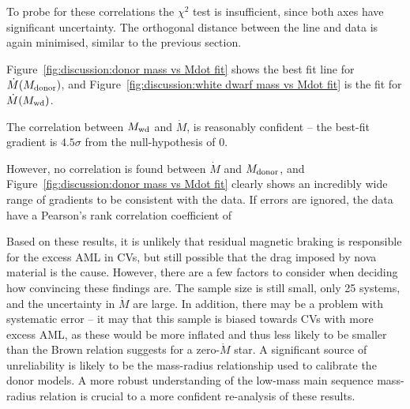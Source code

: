 To probe for these correlations the $\chi^2$ test is insufficient, since both axes have significant uncertainty. The orthogonal distance between the line and data is again minimised, similar to the previous section.

Figure~\ref{fig:discussion:donor mass vs Mdot fit} shows the best fit line for $\dot M(M_{\rm donor})$, and Figure~\ref{fig:discussion:white dwarf mass vs Mdot fit} is the fit for $\dot M(M_{\rm wd})$.

The correlation between $M_{\rm wd}$ and $\dot M$, is reasonably confident -- the best-fit gradient is $4.5\sigma$ from the null-hypothesis of 0.

However, no correlation is found between $\dot M$ and $M_{\rm donor}$, and Figure~\ref{fig:discussion:donor mass vs Mdot fit} clearly shows an incredibly wide range of gradients to be consistent with the data. If errors are ignored, the data have a Pearson's rank correlation coefficient of

Based on these results, it is unlikely that residual magnetic braking is responsible for the excess AML in CVs, but still possible that the drag imposed by nova material is the cause.
However, there are a few factors to consider when deciding how convincing these findings are.
The sample size is still small, only 25 systems, and the uncertainty in $\dot M$ are large. In addition, there may be a problem with systematic error -- it may that this sample is biased towards CVs with more excess AML, as these would be more inflated and thus less likely to be smaller than the Brown relation suggests for a zero-$\dot M$ star.
A significant source of unreliability is likely to be the mass-radius relationship used to calibrate the donor models. A more robust understanding of the low-mass main sequence mass-radius relation is crucial to a more confident re-analysis of these results.

